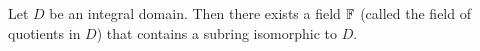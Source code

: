 
\begin{theorem}
	Let $D$ be an integral domain. Then there exists a field $\mathbb{F}$ (called the field of quotients in $D$) that contains a subring isomorphic to $D$.
\end{theorem}
